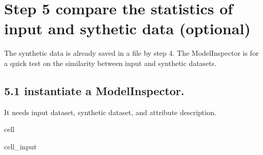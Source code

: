 \documentclass[letterpaper,10pt,english]{jupyterBook}
\begin{document}
\section{Step 5 compare the statistics of input and sythetic data (optional)}
\label{\detokenize{src/test/SynthNAV0:step-5-compare-the-statistics-of-input-and-sythetic-data-optional}}
\sphinxAtStartPar
The synthetic data is already saved in a file by step 4. The ModelInspector is for a quick test on the similarity between input and synthetic datasets.


\subsection{5.1 instantiate a ModelInspector.}
\label{\detokenize{src/test/SynthNAV0:instantiate-a-modelinspector}}
\sphinxAtStartPar
It needs input dataset, synthetic dataset, and attribute description.

\begin{sphinxuseclass}{cell}\begin{sphinxVerbatimInput}

\begin{sphinxuseclass}{cell_input}
\begin{sphinxVerbatim}[commandchars=\\\{\}]
   
  
  \PYG{p}{[}\PYG{p}{]}

    
\end{sphinxVerbatim}

\end{sphinxuseclass}\end{sphinxVerbatimInput}

\end{sphinxuseclass}
\end{document}
